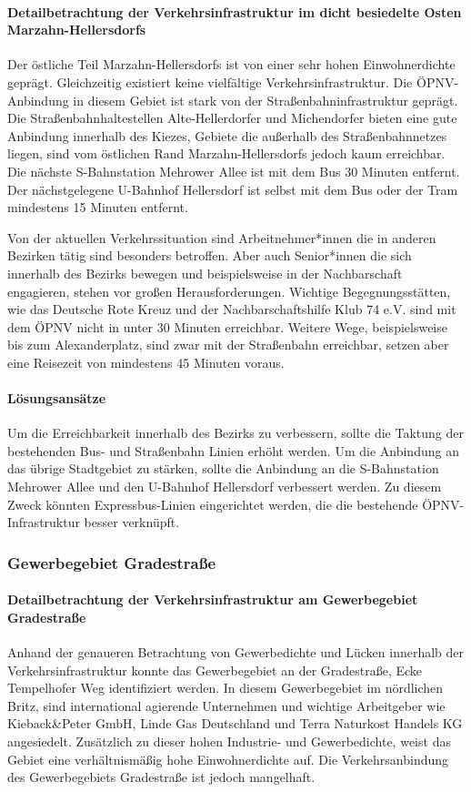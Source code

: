 \paragraph{Detailbetrachtung der Verkehrsinfrastruktur im dicht besiedelte Osten Marzahn-Hellersdorfs}
Der östliche Teil Marzahn-Hellersdorfs ist von einer sehr hohen Einwohnerdichte geprägt. Gleichzeitig existiert keine vielfältige Verkehrsinfrastruktur. Die ÖPNV-Anbindung in diesem Gebiet ist stark von der Straßenbahninfrastruktur geprägt. Die Straßenbahnhaltestellen Alte-Hellerdorfer und Michendorfer bieten eine gute Anbindung innerhalb des Kiezes, Gebiete die außerhalb des Straßenbahnnetzes liegen, sind vom östlichen Rand Marzahn-Hellersdorfs jedoch kaum erreichbar. Die nächste S-Bahnstation Mehrower Allee ist mit dem Bus 30 Minuten entfernt. Der nächstgelegene U-Bahnhof Hellersdorf ist selbst mit dem Bus oder der Tram mindestens 15 Minuten entfernt.


Von der aktuellen Verkehrssituation sind Arbeitnehmer*innen die in anderen Bezirken tätig sind besonders betroffen. Aber auch Senior*innen die sich innerhalb des Bezirks bewegen und beispielsweise in der Nachbarschaft engagieren, stehen vor großen Herausforderungen. Wichtige Begegnungsstätten, wie das Deutsche Rote Kreuz und der Nachbarschaftshilfe Klub 74 e.V. sind mit dem ÖPNV nicht in unter 30 Minuten erreichbar. Weitere Wege, beispielsweise bis zum Alexanderplatz, sind zwar mit der Straßenbahn erreichbar, setzen aber eine Reisezeit von mindestens 45 Minuten voraus.

\paragraph{Lösungsansätze}
Um die Erreichbarkeit innerhalb des Bezirks zu verbessern, sollte die Taktung der bestehenden Bus- und Straßenbahn Linien erhöht werden. Um die Anbindung an das übrige Stadtgebiet zu stärken, sollte die Anbindung an die S-Bahnstation Mehrower Allee und den U-Bahnhof Hellersdorf verbessert werden. Zu diesem Zweck könnten Expressbus-Linien eingerichtet werden, die die bestehende ÖPNV-Infrastruktur besser verknüpft.


\subsubsection{Gewerbegebiet Gradestraße}
\paragraph{Detailbetrachtung der Verkehrsinfrastruktur am Gewerbegebiet Gradestraße}
Anhand der genaueren Betrachtung von Gewerbedichte und Lücken innerhalb der Verkehrsinfrastruktur konnte das Gewerbegebiet an der Gradestraße, Ecke Tempelhofer Weg identifiziert werden. In diesem Gewerbegebiet im nördlichen Britz, sind international agierende Unternehmen und wichtige Arbeitgeber wie Kieback\&Peter GmbH, Linde Gas Deutschland und Terra Naturkost Handels KG angesiedelt. Zusätzlich zu dieser hohen Industrie- und Gewerbedichte, weist das Gebiet eine verhältnismäßig hohe Einwohnerdichte auf. Die Verkehrsanbindung des Gewerbegebiets Gradestraße ist jedoch mangelhaft.

